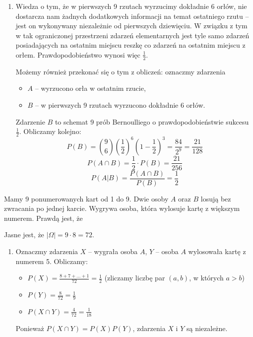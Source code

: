 \begin{solutions}
\begin{enumerate}[\bf A.]
        \item Wiedza o tym, że w pierwszych 9 rzutach wyrzucimy dokładnie 6 orłów, nie dostarcza nam żadnych dodatkowych informacji na temat ostatniego rzutu -- jest on wykonywany niezależnie od pierwszych dziewięciu. W związku z tym w tak ograniczonej przestrzeni zdarzeń elementarnych jest tyle samo zdarzeń posiadających na ostatnim miejscu reszkę co zdarzeń na ostatnim miejscu z orłem. Prawdopodobieństwo wynosi więc $\frac{1}{2}$.

        Możemy również przekonać się o tym z obliczeń: oznaczmy zdarzenia
        \begin{itemize}
            \item $A$ -- wyrzucono orła w ostatnim rzucie,
            \item $B$ -- w pierwszych 9 rzutach wyrzucono dokładnie 6 orłów.
        \end{itemize}

        Zdarzenie $B$ to schemat 9 prób Bernoulliego o prawdopodobieństwie sukcesu $\frac{1}{2}$. Obliczamy kolejno:
        $$P(B) = \binom{9}{6} \left(\frac{1}{2}\right)^6 \left(1 - \frac{1}{2}\right)^3 = \frac{84}{2^{9}} = \frac{21}{128}$$
        $$P(A \cap B) = \frac{1}{2} \cdot P(B) = \frac{21}{256}$$
        $$P(A | B) = \frac{P(A \cap B)}{P(B)} = \frac{1}{2}$$
    \end{enumerate}

    \sol Mamy 9 ponumerowanych kart od 1 do 9. Dwie osoby $A$ oraz $B$ losują bez zwracania po jednej karcie. Wygrywa osoba, która wylosuje kartę z większym numerem. Prawdą jest, że

    Jasne jest, że $|\Omega| = 9 \cdot 8 = 72$.
    \begin{enumerate}[\bf A.]
        \item Oznaczmy zdarzenia $X$ -- wygrała osoba $A$, $Y$ -- osoba $A$ wylosowała kartę z numerem 5. Obliczamy:
        \begin{itemize}
            \item $P(X) = \frac{8 + 7 + ... + 1}{72} = \frac{1}{2}$ (zliczamy liczbę par $(a, b)$, w których $a > b$)
            \item $P(Y) = \frac{8}{72} = \frac{1}{9}$
            \item $P(X \cap Y) = \frac{4}{72} = \frac{1}{18}$
        \end{itemize}
        Ponieważ $P(X \cap Y) = P(X)P(Y)$, zdarzenia $X$ i $Y$ są niezależne.


\end{enumerate}
\end{solutions}
